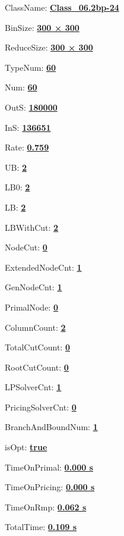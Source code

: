 \documentclass[11pt]{article}
\begin{document}
\pagestyle{empty}


ClassName: \underline{\textbf{Class_06.2bp-24}}
\par
BinSize: \underline{\textbf{300 × 300}}
\par
ReduceSize: \underline{\textbf{300 × 300}}
\par
TypeNum: \underline{\textbf{60}}
\par
Num: \underline{\textbf{60}}
\par
OutS: \underline{\textbf{180000}}
\par
InS: \underline{\textbf{136651}}
\par
Rate: \underline{\textbf{0.759}}
\par
UB: \underline{\textbf{2}}
\par
LB0: \underline{\textbf{2}}
\par
LB: \underline{\textbf{2}}
\par
LBWithCut: \underline{\textbf{2}}
\par
NodeCut: \underline{\textbf{0}}
\par
ExtendedNodeCnt: \underline{\textbf{1}}
\par
GenNodeCnt: \underline{\textbf{1}}
\par
PrimalNode: \underline{\textbf{0}}
\par
ColumnCount: \underline{\textbf{2}}
\par
TotalCutCount: \underline{\textbf{0}}
\par
RootCutCount: \underline{\textbf{0}}
\par
LPSolverCnt: \underline{\textbf{1}}
\par
PricingSolverCnt: \underline{\textbf{0}}
\par
BranchAndBoundNum: \underline{\textbf{1}}
\par
isOpt: \underline{\textbf{true}}
\par
TimeOnPrimal: \underline{\textbf{0.000 s}}
\par
TimeOnPricing: \underline{\textbf{0.000 s}}
\par
TimeOnRmp: \underline{\textbf{0.062 s}}
\par
TotalTime: \underline{\textbf{0.109 s}}
\par
\newpage
\end{document}
